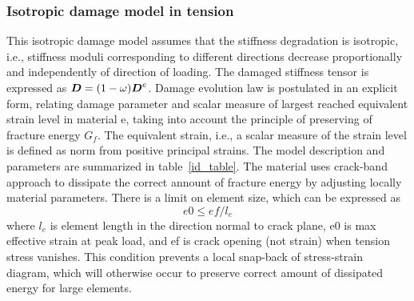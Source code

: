 \documentclass[epsf,a4paper]{article}
\newcommand{\mbf}[1]{\mbox{\boldmath$#1$}}
\begin{document}
\subsubsection{Isotropic damage model in tension}
This isotropic damage model assumes that the stiffness degradation is
isotropic, i.e., stiffness moduli corresponding to different
directions decrease proportionally and independently of direction of
loading. The damaged stiffness tensor is expressed as
$\mbf{D}=(1-\omega)\mbf{D}^e$.
Damage evolution law is postulated in an explicit form, relating
damage parameter and scalar measure of largest reached equivalent strain level in
material e, taking into account the principle of preserving of fracture
energy $G_f$. The equivalent strain, i.e., a scalar measure of the
strain level is defined as norm from positive principal strains.
The model description and parameters are summarized
in table~\ref{id_table}. The material uses crack-band approach to dissipate the 
correct annount of fracture energy by adjusting locally material parameters. 
There is a limit on element size, which can be expressed as
$$
e0 \le ef/l_e
$$
where $l_e$ is element length in the direction normal to crack plane, e0 is max effective strain at peak load, 
and ef is crack opening (not strain) when tension stress vanishes.
This condition prevents a local snap-back of stress-strain diagram, 
which will otherwise occur to preserve correct amount of dissipated energy for large elements. 
\end{document}
